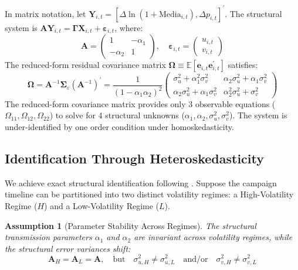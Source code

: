 \documentclass[12pt, a4paper]{article}
\newtheorem{assumption}{Assumption}
\begin{document}
In matrix notation, let $\mathbf{Y}_{i,t} = [\Delta \ln(1 + \text{Media}_{i,t}), \Delta p_{i,t}]^\prime$. The structural system is $\mathbf{A} \mathbf{Y}_{i,t} = \mathbf{\Gamma} \mathbf{X}_{i,t} + \boldsymbol{\varepsilon}_{i,t}$, where:
\begin{equation}
\mathbf{A} = \begin{pmatrix} 1 & -\alpha_1 \\ -\alpha_2 & 1 \end{pmatrix}, \quad \boldsymbol{\varepsilon}_{i,t} = \begin{pmatrix} u_{i,t} \\ v_{i,t} \end{pmatrix}
\end{equation}
The reduced-form residual covariance matrix $\mathbf{\Omega} \equiv \mathbb{E}[\mathbf{e}_{i,t} \mathbf{e}_{i,t}^\prime]$ satisfies:
\begin{equation}
\mathbf{\Omega} = \mathbf{A}^{-1} \mathbf{\Sigma}_\varepsilon (\mathbf{A}^{-1})^\prime = \frac{1}{(1 - \alpha_1 \alpha_2)^2} \begin{pmatrix} \sigma_u^2 + \alpha_1^2 \sigma_v^2 & \alpha_2 \sigma_u^2 + \alpha_1 \sigma_v^2 \\ \alpha_2 \sigma_u^2 + \alpha_1 \sigma_v^2 & \alpha_2^2 \sigma_u^2 + \sigma_v^2 \end{pmatrix}
\end{equation}
The reduced-form covariance matrix provides only 3 observable equations ($\Omega_{11}, \Omega_{12}, \Omega_{22}$) to solve for 4 structural unknowns ($\alpha_1, \alpha_2, \sigma_u^2, \sigma_v^2$). The system is under-identified by one order condition under homoskedasticity.

\subsection{Identification Through Heteroskedasticity}
We achieve exact structural identification following \citet{Rigobon2003}. Suppose the campaign timeline can be partitioned into two distinct volatility regimes: a High-Volatility Regime ($H$) and a Low-Volatility Regime ($L$).

\begin{assumption}[Parameter Stability Across Regimes]
\label{ass:rigobon}
The structural transmission parameters $\alpha_1$ and $\alpha_2$ are invariant across volatility regimes, while the structural error variances shift:
\begin{equation}
\mathbf{A}_H = \mathbf{A}_L = \mathbf{A}, \quad \text{but} \quad \sigma_{u, H}^2 \ne \sigma_{u, L}^2 \quad \text{and/or} \quad \sigma_{v, H}^2 \ne \sigma_{v, L}^2
\end{equation}
\end{assumption}
\end{document}

